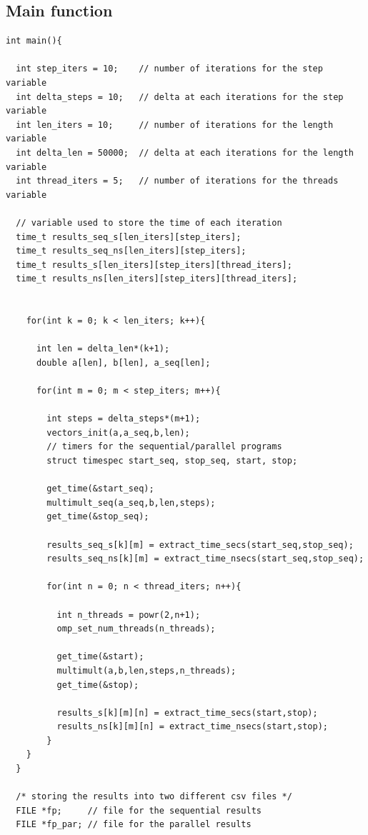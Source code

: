 \documentclass[a4paper]{article}
\begin{document}
\subsection{Main function}

\begin{verbatim}
int main(){

  int step_iters = 10;    // number of iterations for the step variable
  int delta_steps = 10;   // delta at each iterations for the step variable
  int len_iters = 10;     // number of iterations for the length variable
  int delta_len = 50000;  // delta at each iterations for the length variable
  int thread_iters = 5;   // number of iterations for the threads variable

  // variable used to store the time of each iteration
  time_t results_seq_s[len_iters][step_iters];
  time_t results_seq_ns[len_iters][step_iters];
  time_t results_s[len_iters][step_iters][thread_iters];
  time_t results_ns[len_iters][step_iters][thread_iters];


    for(int k = 0; k < len_iters; k++){

      int len = delta_len*(k+1);
      double a[len], b[len], a_seq[len];

      for(int m = 0; m < step_iters; m++){

        int steps = delta_steps*(m+1);
        vectors_init(a,a_seq,b,len);
        // timers for the sequential/parallel programs
        struct timespec start_seq, stop_seq, start, stop;

        get_time(&start_seq);
        multimult_seq(a_seq,b,len,steps);
        get_time(&stop_seq);

        results_seq_s[k][m] = extract_time_secs(start_seq,stop_seq);
        results_seq_ns[k][m] = extract_time_nsecs(start_seq,stop_seq);

        for(int n = 0; n < thread_iters; n++){

          int n_threads = powr(2,n+1);
          omp_set_num_threads(n_threads);

          get_time(&start);
          multimult(a,b,len,steps,n_threads);
          get_time(&stop);

          results_s[k][m][n] = extract_time_secs(start,stop);
          results_ns[k][m][n] = extract_time_nsecs(start,stop);
        }
    }
  }

  /* storing the results into two different csv files */
  FILE *fp;     // file for the sequential results
  FILE *fp_par; // file for the parallel results


\end{verbatim}
\end{document}
